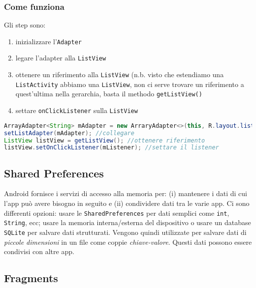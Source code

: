 \subsubsection{Come funziona}

Gli step sono:

\begin{enumerate}
\item inizializzare l'\texttt{Adapter}
\item legare l'adapter alla \texttt{ListView}
\item ottenere un riferimento alla \texttt{ListView} (n.b. visto che estendiamo una \texttt{ListActivity} abbiamo una \texttt{ListView}, non ci serve trovare un riferimento a quest'ultima nella gerarchia, basta il methodo \texttt{getListView()}
\item settare \texttt{onClickListener} sulla \texttt{ListView}
\end{enumerate}

\begin{lstlisting}[language=Java, basicstyle=\footnotesize]
ArrayAdapter<String> mAdapter = new ArraryAdapter<>(this, R.layout.listview_layout, FACULTY); //inizializzare
setListAdapter(mAdapter); //collegare
ListView listView = getListView(); //ottenere riferimento
listView.setOnClickListener(mListener); //settare il listener
\end{lstlisting}

\subsection{Shared Preferences}

Android fornisce i servizi di accesso alla memoria per: (i) mantenere i dati di cui l'app può avere bisogno in seguito e (ii) condividere dati tra le varie app. Ci sono differenti opzioni: usare le \texttt{SharedPreferences} per dati semplici come \texttt{int}, \texttt{String}, ecc; usare la memoria interna/esterna del dispositivo o usare un database \texttt{SQLite} per salvare dati strutturati.
Vengono quindi utilizzate per salvare dati di \textit{piccole dimensioni} in un file come coppie \textit{chiave-valore}. Questi dati possono essere condivisi con altre app.

\subsection{Fragments}

